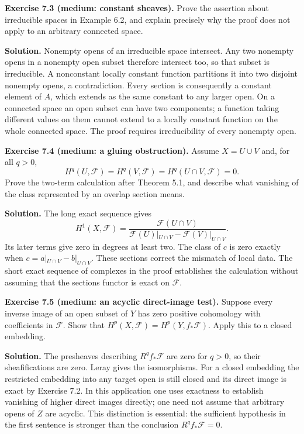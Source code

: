 \documentclass[11pt]{article}
\begin{document}
\textbf{Exercise 7.3 (medium: constant sheaves).} Prove the assertion
about irreducible spaces in Example 6.2, and explain precisely why the
proof does not apply to an arbitrary connected space.

\textbf{Solution.} Nonempty opens of an irreducible space intersect. Any
two nonempty opens in a nonempty open subset therefore intersect too, so
that subset is irreducible. A nonconstant locally constant function
partitions it into two disjoint nonempty opens, a contradiction. Every
section is consequently a constant element of \(A\), which extends as
the same constant to any larger open. On a connected space an open
subset can have two components; a function taking different values on
them cannot extend to a locally constant function on the whole connected
space. The proof requires irreducibility of every nonempty open.

\textbf{Exercise 7.4 (medium: a gluing obstruction).} Assume
\(X=U\cup V\) and, for all \(q>0\), \[
H^q(U,\mathcal F)=H^q(V,\mathcal F)=H^q(U\cap V,\mathcal F)=0.
\] Prove the two-term calculation after Theorem 5.1, and describe what
vanishing of the class represented by an overlap section means.

\textbf{Solution.} The long exact sequence gives \[
H^1(X,\mathcal F)=\frac{\mathcal F(U\cap V)}{\mathcal F(U)|_{U\cap V}-\mathcal F(V)|_{U\cap V}}.
\] Its later terms give zero in degrees at least two. The class of \(c\)
is zero exactly when \(c=a|_{U\cap V}-b|_{U\cap V}\). These sections
correct the mismatch of local data. The short exact sequence of
complexes in the proof establishes the calculation without assuming that
the sections functor is exact on \(\mathcal F\).

\textbf{Exercise 7.5 (medium: an acyclic direct-image test).} Suppose
every inverse image of an open subset of \(Y\) has zero positive
cohomology with coefficients in \(\mathcal F\). Show that
\(H^p(X,\mathcal F)=H^p(Y,f_*\mathcal F)\). Apply this to a closed
embedding.

\textbf{Solution.} The presheaves describing \(R^qf_*\mathcal F\) are
zero for \(q>0\), so their sheafifications are zero. Leray gives the
isomorphisms. For a closed embedding the restricted embedding into any
target open is still closed and its direct image is exact by Exercise
7.2. In this application one uses exactness to establish vanishing of
higher direct images directly; one need not assume that arbitrary opens
of \(Z\) are acyclic. This distinction is essential: the sufficient
hypothesis in the first sentence is stronger than the conclusion
\(R^qf_*\mathcal F=0\).
\end{document}
